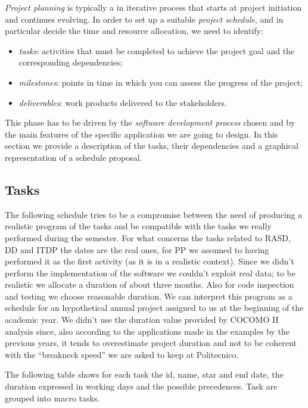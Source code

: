 \emph{Project planning} is typically a in iterative process that starts
at project initiation and continues evolving. In order to set up a
suitable \emph{project schedule}, and in particular decide the time
and resource allocation, we need to identify:
\begin{itemize}
\item \emph{tasks}: activities that must be completed to achieve the project
goal and the corresponding dependencies;
\item \emph{milestones}: points in time in which you can assess the progress
of the project;
\item \emph{deliverables}: work products delivered to the stakeholders.
\end{itemize}
This phase has to be driven by the \emph{software development process}
chosen and by the main features of the specific application we are
going to design. In this section we provide a description of the tasks,
their dependencies and a graphical representation of a schedule proposal.


\subsection{Tasks}

The following schedule tries to be a compromise between the need of
producing a realistic program of the tasks and be compatible with
the tasks we really performed during the semester. For what concerns
the tasks related to RASD, DD and ITDP the dates are the real ones,
for PP we assumed to having performed it as the first activity (as
it is in a realistic context). Since we didn't perform the implementation
of the software we couldn't exploit real data; to be realistic we
allocate a duration of about three months. Also for code inspection
and testing we choose reasonable duration. We can interpret this program
as a schedule for an hypothetical annual project assigned to us at
the beginning of the academic year. We didn't use the duration value
provided by COCOMO II analysis since, also according to the applications
made in the examples by the previous years, it tends to overestimate
project duration and not to be coherent with the ``breakneck speed''
we are asked to keep at Politecnico.

\newpage{}

The following table shows for each task the id, name, star and end
date, the duration expressed in working days and the possible precedences.
Task are grouped into macro tasks.

